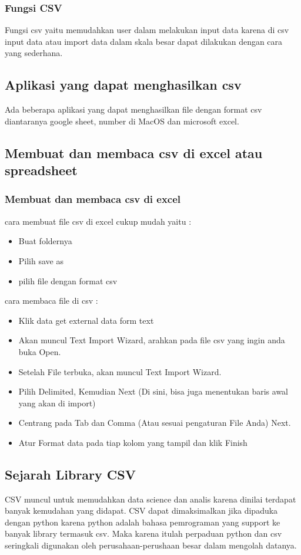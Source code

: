 \subsubsection{Fungsi CSV}
Fungsi csv yaitu memudahkan user dalam melakukan input data karena di csv input data atau import data dalam skala besar dapat dilakukan dengan cara yang sederhana.
\subsection{Aplikasi yang dapat menghasilkan csv}
Ada beberapa aplikasi yang dapat menghasilkan file dengan format csv diantaranya google sheet, number di MacOS dan microsoft excel.
\subsection{Membuat dan membaca csv di excel atau spreadsheet}
\subsubsection{Membuat dan membaca csv di excel}
cara membuat file csv di excel cukup mudah yaitu :
\begin{itemize}
	\item Buat foldernya
	\item Pilih save as
	\item pilih file dengan format csv
\end{itemize}
cara membaca file di csv :
\begin{itemize}
	\item Klik data get external data form text
	\item Akan muncul Text Import Wizard, arahkan pada file csv yang ingin anda buka Open.
	\item Setelah File terbuka, akan muncul Text Import Wizard.
	\item Pilih Delimited, Kemudian Next (Di sini, bisa juga menentukan baris awal yang akan di import)
	\item Centrang pada Tab dan Comma (Atau sesuai pengaturan File Anda) Next.
	\item Atur Format data pada tiap kolom yang tampil dan klik Finish
\end{itemize}
\subsection{Sejarah Library CSV}
CSV muncul untuk memudahkan data science dan analis karena dinilai terdapat banyak kemudahan yang didapat. CSV dapat dimaksimalkan jika dipaduka dengan python karena python adalah bahasa pemrograman yang support ke banyak library termasuk csv. Maka karena itulah perpaduan python dan csv seringkali digunakan oleh perusahaan-perushaan besar dalam mengolah datanya.
